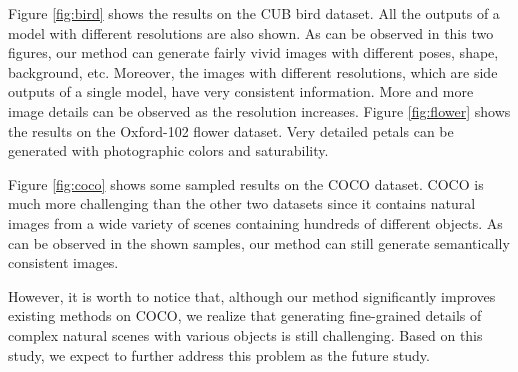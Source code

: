 \documentclass[10pt, letterpaper]{article}
\begin{document}
Figure \ref{fig:bird} shows the results on the CUB bird dataset. All the outputs of a model with different resolutions are also shown. As can be observed in this two figures, our method can generate fairly vivid images with different poses, shape, background, etc. Moreover, the images with different resolutions, which are side outputs of a single model, have very consistent information. More and more image details can be observed as the resolution increases.
Figure \ref{fig:flower} shows the results on the Oxford-102 flower dataset. Very detailed petals can be generated with photographic colors and saturability.

Figure \ref{fig:coco} shows some sampled results on the COCO dataset. COCO is much more challenging than the other two datasets since it contains natural images from a wide variety of scenes containing hundreds of different objects. 
As can be observed in the shown samples, our method can still generate semantically consistent images. %

However, it is worth to notice that, although our method significantly improves existing methods \cite{han2017stackgan,reed2016generative} on COCO, we realize that generating fine-grained details of complex natural scenes with various objects is still challenging. Based on this study, we expect to further address this problem as the future study. 

\newpage
\end{document}
